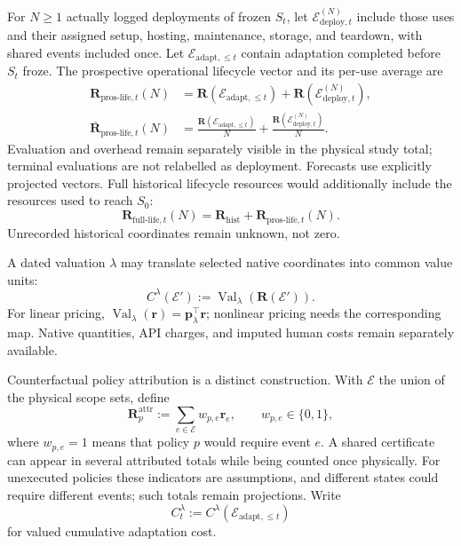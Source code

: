 \documentclass[10pt]{article} %
\providecommand{\1}{\mathbf{1}}  %
\theoremstyle{remark}
\theoremstyle{definition}
\begin{document}
For $N\geq1$ actually logged deployments of frozen $S_t$, let
$\mathcal E_{\mathrm{deploy},t}^{(N)}$ include those uses and their
assigned setup, hosting, maintenance, storage, and teardown, with shared
events included once. Let $\mathcal E_{\mathrm{adapt},\leq t}$ contain
adaptation completed before $S_t$ froze. The prospective operational
lifecycle vector and its per-use average are
\begin{align}
\mathbf R_{\mathrm{pros\text{-}life},t}(N)
&=\mathbf R(\mathcal E_{\mathrm{adapt},\leq t})
+\mathbf R(\mathcal E_{\mathrm{deploy},t}^{(N)}),
\label{eq:prospective-lifecycle-resources}\\
\overline{\mathbf R}_{\mathrm{pros\text{-}life},t}(N)
&=\frac{\mathbf R(\mathcal E_{\mathrm{adapt},\leq t})}{N}
+\frac{\mathbf R(\mathcal E_{\mathrm{deploy},t}^{(N)})}{N}.
\label{eq:average-prospective-lifecycle-resources}
\end{align}
Evaluation and overhead remain separately visible in the physical study
total; terminal evaluations are not relabelled as deployment. Forecasts
use explicitly projected vectors. Full historical lifecycle resources
would additionally include the resources used to reach $S_0$:
\begin{equation}
\mathbf R_{\mathrm{full\text{-}life},t}(N)
=\mathbf R_{\mathrm{hist}}+\mathbf R_{\mathrm{pros\text{-}life},t}(N).
\label{eq:full-lifecycle-resources}
\end{equation}
Unrecorded historical coordinates remain unknown, not zero.

A dated valuation $\lambda$ may translate selected native coordinates
into common value units:
\begin{equation}
C^\lambda(\mathcal E')
:=\operatorname{Val}_\lambda(\mathbf R(\mathcal E')).
\label{eq:resource-valuation-map}
\end{equation}
For linear pricing,
$\operatorname{Val}_\lambda(\mathbf r)=\mathbf p_\lambda^\top\mathbf r$;
nonlinear pricing needs the corresponding map. Native quantities, API
charges, and imputed human costs remain separately available.

Counterfactual policy attribution is a distinct construction. With
$\mathcal E$ the union of the physical scope sets, define
\begin{equation}
\mathbf R_p^{\mathrm{attr}}
:=\sum_{e\in\mathcal E}w_{p,e}\mathbf r_e,
\qquad w_{p,e}\in\{0,1\},
\label{eq:policy-attributed-resources}
\end{equation}
where $w_{p,e}=1$ means that policy $p$ would require event $e$.
A shared certificate can appear in several attributed totals while
being counted once physically. For unexecuted policies these indicators
are assumptions, and different states could require different events;
such totals remain projections. Write
\begin{equation}
C_t^\lambda:=C^\lambda(\mathcal E_{\mathrm{adapt},\leq t})
\label{eq:cumulative-valued-adaptation-cost}
\end{equation}
for valued cumulative adaptation cost.
\end{document}
